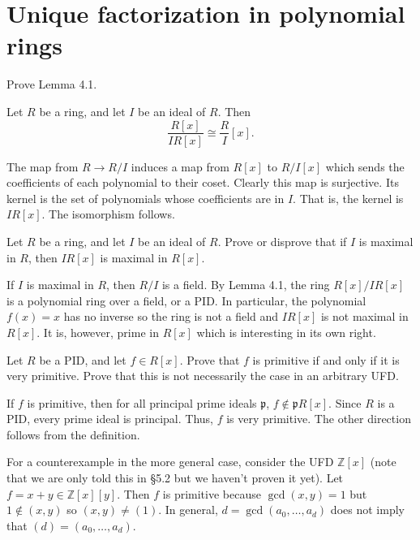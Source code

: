 \documentclass[../../master.tex]{subfiles}
\begin{document}
\section{Unique factorization in polynomial rings}

    \begin{problem}
        Prove Lemma 4.1.
        \begin{proposition}[Lemma 4.1]
            Let $R$ be a ring, and let $I$ be an ideal of $R$. Then 
            \[
                \frac{R[x]}{IR[x]} \cong \frac{R}{I}[x].
            \] 
        \end{proposition}
    \end{problem}

    \begin{solution}
        The map from $R \to R / I$ induces a map from $R[x]$ to $R / I [x]$
        which sends the coefficients of each polynomial to their coset. Clearly
        this map is surjective. Its kernel is the set of polynomials whose
        coefficients are in $I$. That is, the kernel is $IR[x]$. The isomorphism
        follows.
    \end{solution}

    \begin{problem}
        Let $R$ be a ring, and let $I$ be an ideal of $R$. Prove or disprove
        that if $I$ is maximal in $R$, then $IR[x]$ is maximal in $R[x]$.
    \end{problem}

    \begin{solution}
        If $I$ is maximal in $R$, then $R / I$ is a field. By Lemma 4.1, the
        ring $R[x] / IR[x]$ is a polynomial ring over a field, or a PID. In
        particular, the polynomial $f(x) = x$ has no inverse so the ring is not
        a field and $IR[x]$ is not maximal in $R[x]$. It is, however, prime in
        $R[x]$ which is interesting in its own right.
    \end{solution}

    \begin{problem}
        Let $R$ be a PID, and let $f \in R[x]$. Prove that $f$ is primitive if
        and only if it is very primitive. Prove that this is not necessarily the
        case in an arbitrary UFD.
    \end{problem}

    \begin{solution}
        If $f$ is primitive, then for all principal prime ideals $\mathfrak{p}$,
        $f \notin \mathfrak{p}R[x]$. Since $R$ is a PID, every prime ideal is
        principal. Thus, $f$ is very primitive. The other direction follows from
        the definition.

        For a counterexample in the more general case, consider the UFD
        $\mathbb{Z}[x]$ (note that we are only told this in \S 5.2 but we
        haven't proven it yet). Let $f = x + y \in \mathbb{Z}[x][y]$. Then $f$
        is primitive because $\gcd(x, y) = 1$ but $1 \notin (x, y)$ so $(x, y)
        \neq (1)$. In general, $d = \gcd(a_0, \ldots, a_d)$ does not imply that
        $(d) = (a_0, \ldots, a_d)$.
    \end{solution}
\end{document}
